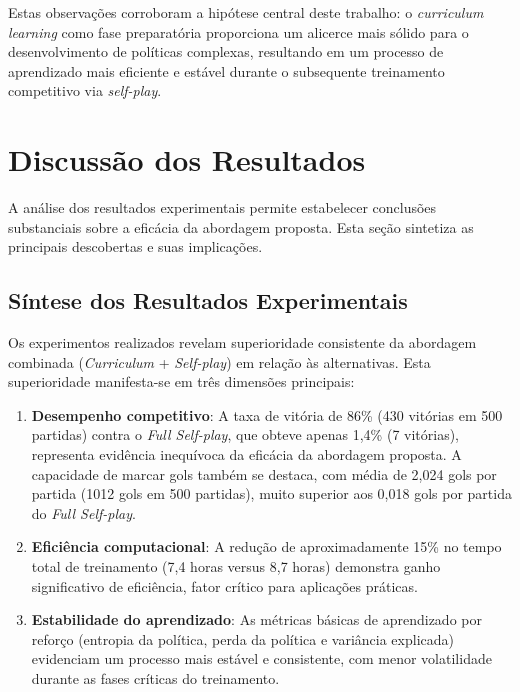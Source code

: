 Estas observações corroboram a hipótese central deste trabalho: o \textit{curriculum learning} como fase preparatória proporciona um alicerce mais sólido para o desenvolvimento de políticas complexas, resultando em um processo de aprendizado mais eficiente e estável durante o subsequente treinamento competitivo via \textit{self-play}.

\section{Discussão dos Resultados}
\label{sec:discussao_resultados}

A análise dos resultados experimentais permite estabelecer conclusões substanciais sobre a eficácia da abordagem proposta. Esta seção sintetiza as principais descobertas e suas implicações.

\subsection{Síntese dos Resultados Experimentais}

Os experimentos realizados revelam superioridade consistente da abordagem combinada (\textit{Curriculum} + \textit{Self-play}) em relação às alternativas. Esta superioridade manifesta-se em três dimensões principais:

\begin{enumerate}
    \item \textbf{Desempenho competitivo}: A taxa de vitória de 86\% (430 vitórias em 500 partidas) contra o \textit{Full Self-play}, que obteve apenas 1,4\% (7 vitórias), representa evidência inequívoca da eficácia da abordagem proposta. A capacidade de marcar gols também se destaca, com média de 2,024 gols por partida (1012 gols em 500 partidas), muito superior aos 0,018 gols por partida do \textit{Full Self-play}.

    \item \textbf{Eficiência computacional}: A redução de aproximadamente 15\% no tempo total de treinamento (7,4 horas versus 8,7 horas) demonstra ganho significativo de eficiência, fator crítico para aplicações práticas.

    \item \textbf{Estabilidade do aprendizado}: As métricas básicas de aprendizado por reforço (entropia da política, perda da política e variância explicada) evidenciam um processo mais estável e consistente, com menor volatilidade durante as fases críticas do treinamento.
\end{enumerate}

